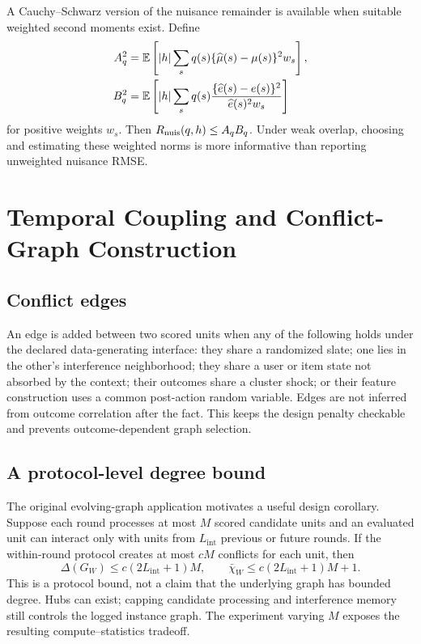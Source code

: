 A Cauchy--Schwarz version of the nuisance remainder is available when suitable weighted second moments exist. Define
\begin{align*}
A_q^2&=\mathbb{E}\left[\left|h\right|\sum_s q(s)\{\widehat\mu(s)-\mu(s)\}^2w_s\right],\\
B_q^2&=\mathbb{E}\left[\left|h\right|\sum_s q(s)
\frac{\{\widehat e(s)-e(s)\}^2}{\widehat e(s)^2w_s}\right]
\end{align*}
for positive weights $w_s$. Then $R_{\mathrm{nuis}}(q,h)\le A_qB_q$. Under weak overlap, choosing and estimating these weighted norms is more informative than reporting unweighted nuisance RMSE.

\section{Temporal Coupling and Conflict-Graph Construction}
\label{app:dependence}

\subsection{Conflict edges}
An edge is added between two scored units when any of the following holds under the declared data-generating interface: they share a randomized slate; one lies in the other's interference neighborhood; they share a user or item state not absorbed by the context; their outcomes share a cluster shock; or their feature construction uses a common post-action random variable. Edges are not inferred from outcome correlation after the fact. This keeps the design penalty checkable and prevents outcome-dependent graph selection.

\subsection{A protocol-level degree bound}
The original evolving-graph application motivates a useful design corollary. Suppose each round processes at most $M$ scored candidate units and an evaluated unit can interact only with units from $L_{\mathrm{int}}$ previous or future rounds. If the within-round protocol creates at most $cM$ conflicts for each unit, then
\begin{equation}
    \Delta(G_W)\le c(2L_{\mathrm{int}}+1)M,
    \qquad
    \bar\chi_W\le c(2L_{\mathrm{int}}+1)M+1.
\label{eq:protocol-degree}
\end{equation}
This is a protocol bound, not a claim that the underlying graph has bounded degree. Hubs can exist; capping candidate processing and interference memory still controls the logged instance graph. The experiment varying $M$ exposes the resulting compute--statistics tradeoff.

